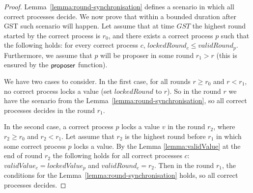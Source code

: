 \begin{proof}
Lemma~\ref{lemma:round-synchronisation} defines a scenario in which all correct processes decide. We now prove that within a bounded duration after GST such scenario will happen. Let
assume that at time $GST$ the highest round started by the correct process is $r_0$, and  there exists a correct process $p$ such that the following holds: for every correct process $c$, $lockedRound_c \le validRound_p$. Furthermore, we assume that $p$ will be proposer in some round $r_1 > r$ (this is ensured by the $\mathsf{proposer}$ function). 

We have two cases to consider. In the first case, for all rounds $r \ge r_0$ and $r < r_1$, no correct process locks a value (set $lockedRound$ to $r$). So in the round $r$ we have the scenario from the Lemma~\ref{lemma:round-synchronisation}, so all correct processes decides in the round $r_1$.  

In the second case, a correct process $p$ locks a value $v$ in the round $r_2$, where $r_2 \ge r_0$ and $r_2 < r_1$.  Let assume that $r_2$ is the highest round before $r_1$ in which some correct process $p$ locks a value. By the Lemma \ref{lemma:validValue} at the end of round $r_2$ the following holds for all correct processes $c$: $validValue_c = lockedValue_p$ and $validRound_c = r_2$. Then in the round $r_1$, the conditions for the Lemma~\ref{lemma:round-synchronisation} holds, so all correct processes decides.
\end{proof}	

